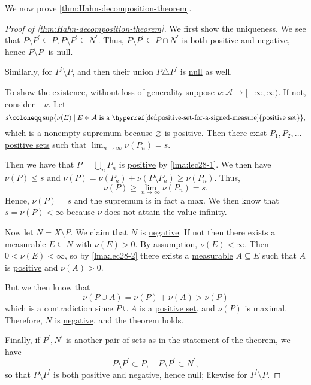 We now prove \autoref{thm:Hahn-decomposition-theorem}.
\begin{proof}[Proof of \autoref{thm:Hahn-decomposition-theorem}]
	We first show the uniqueness. We see that \(P \setminus P^\prime \subseteq P, P \setminus P^\prime  \subseteq N^\prime \). Thus, \(P \setminus P^\prime  \subseteq P \cap N^\prime \)
	is both \hyperref[def:positive-set-for-a-signed-measure]{positive} and \hyperref[def:negative-set-for-a-signed-measure]{negative}, hence \(P \setminus P^\prime\) is \hyperref[def:null-set-for-a-signed-measure]{null}.

	Similarly, for \(P^\prime \setminus P\), and then their union \(P \triangle P^\prime\) is \hyperref[def:null-set-for-a-signed-measure]{null} as well.

	\par To show the existence, without loss of generality suppose \(\nu \colon \mathcal{A} \to [-\infty,\infty)\). If not, consider \(-\nu\). Let
	\[
		s \coloneqq \sup\{\nu(E) \mid E \in \mathcal{A} \text{ is a \hyperref[def:positive-set-for-a-signed-measure]{positive set}}\},
	\]
	which is a nonempty supremum because \(\varnothing\) is \hyperref[def:positive-set-for-a-signed-measure]{positive}. Then there exist
	\(P_1,P_2,\dots\) \hyperref[def:positive-set-for-a-signed-measure]{positive sets} such that \(\lim_{n\to \infty } \nu(P_n) = s\).

	Then we have that \(P = \bigcup_n P_n\) is \hyperref[def:positive-set-for-a-signed-measure]{positive} by \autoref{lma:lec28-1}.
	We then have \(\nu(P) \leq s\) and \(\nu(P) = \nu(P_n) + \nu(P \setminus P_n) \geq \nu(P_n)\). Thus,
	\[
		\nu(P) \geq \lim_{n \to \infty} \nu(P_n) = s.
	\]
	Hence, \(\nu(P) = s\) and the supremum is in fact a max. We then know that \(s = \nu(P) < \infty\) because \(\nu\) does not attain the value infinity.

	Now let \(N = X \setminus P\). We claim that \(N\) is \hyperref[def:negative-set-for-a-signed-measure]{negative}. If not then there exists a
	\hyperref[def:measurable-set]{measurable} \(E \subseteq N\) with \(\nu(E) > 0\).
	By assumption, \(\nu(E) < \infty\). Then \(0 < \nu(E) < \infty\), so by \autoref{lma:lec28-2} there exists a \hyperref[def:measurable-set]{measurable}
	\(A \subseteq E\) such that \(A\) is \hyperref[def:positive-set-for-a-signed-measure]{positive} and \(\nu(A) > 0\).

	But we then know that
	\[
		\nu(P \cup A) = \nu(P) + \nu(A) > \nu(P)
	\]
	which is a contradiction since \(P \cup A\) is a \hyperref[def:positive-set-for-a-signed-measure]{positive set}, and \(\nu(P)\) is maximal. Therefore,
	\(N\) is \hyperref[def:negative-set-for-a-signed-measure]{negative}, and the theorem holds.

	\par Finally, if \(P^\prime , N^\prime \) is another pair of sets as in the statement of the theorem, we have
	\[
		P\setminus P^\prime \subset P,\quad P\setminus P^\prime \subset N^\prime,
	\]
	so that \(P\setminus P^\prime \) is both positive and negative, hence null; likewise for \(P^\prime \setminus P\).
\end{proof}

